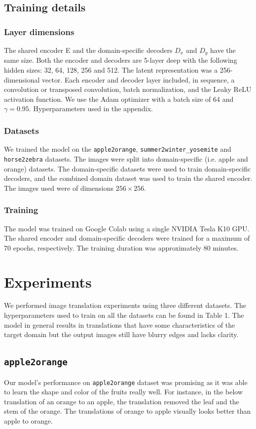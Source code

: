 \documentclass{article}
\begin{document}
\subsection{Training details}
\subsubsection{Layer dimensions}
The shared encoder E and the domain-specific decoders $D_x$ and $D_y$ have the same size. Both the encoder and decoders are 5-layer deep with the following hidden sizes: 32, 64, 128, 256 and 512. The latent representation was a 256-dimensional vector. Each encoder and decoder layer included, in sequence, a convolution or transposed convolution, batch normalization, and the Leaky ReLU activation function. We use the Adam optimizer with a batch size of 64 and $\gamma = 0.95$. Hyperparameters used in the appendix.

\subsubsection{Datasets}
We trained the model on the \texttt{apple2orange}, \texttt{summer2winter\_yosemite} and \texttt{horse2zebra} datasets. The images were split into domain-specific (i.e. apple and orange) datasets. The domain-specific datasets were used to train domain-specific decoders, and the combined domain dataset was used to train the shared encoder. The images used were of dimensions $256\times256$.
\subsubsection{Training}
The model was trained on Google Colab using a single NVIDIA Tesla K10 GPU. The shared encoder and domain-specific decoders were trained for a maximum of 70 epochs, respectively. The training duration was approximately 80 minutes.

\section{Experiments}
We performed image translation experiments using three different datasets. The hyperparameters used to train on all the datasets can be found in Table 1. The model in general results in translations that have some characteristics of the target domain but the output images still have blurry edges and lacks clarity.
\subsection{\texttt{apple2orange}}
Our model's performance on \texttt{apple2orange} dataset was promising as it was able to learn the shape and color of the fruits really well. For instance, in the below translation of an orange to an apple, the translation removed the leaf and the stem of the orange. The translations of orange to apple visually looks better than apple to orange.
\end{document}
